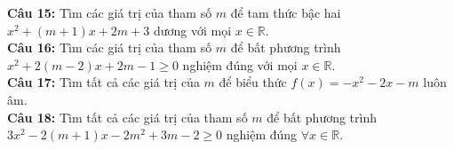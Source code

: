 \documentclass[12pt,a4paper]{extarticle}
\begin{document}
\vspace{0.2cm}
\noindent\textbf{Câu 15:} Tìm các giá trị của tham số $m$ để tam thức bậc hai $x^2 + (m+1)x + 2m + 3$ dương với mọi $x \in \mathbb{R}$.\\
\vspace{0.2cm}
\noindent\textbf{Câu 16:} Tìm các giá trị của tham số $m$ để bất phương trình $x^2 + 2(m-2)x + 2m - 1 \ge 0$ nghiệm đúng với mọi $x \in \mathbb{R}$.\\
\vspace{0.2cm}
\noindent\textbf{Câu 17:} Tìm tất cả các giá trị của $m$ để biểu thức $f(x) = -x^2 - 2x - m$ luôn âm.\\
\vspace{0.2cm}
\noindent\textbf{Câu 18:} Tìm tất cả các giá trị của tham số $m$ để bất phương trình $3x^2 - 2(m+1)x - 2m^2 + 3m - 2 \ge 0$ nghiệm đúng $\forall x \in \mathbb{R}$.
\end{document}
